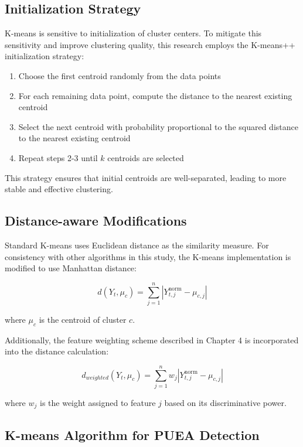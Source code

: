\subsection{Initialization Strategy}

K-means is sensitive to initialization of cluster centers. To mitigate this sensitivity and improve clustering quality, this research employs the K-means++ initialization strategy:

\begin{enumerate}
    \item Choose the first centroid randomly from the data points
    \item For each remaining data point, compute the distance to the nearest existing centroid
    \item Select the next centroid with probability proportional to the squared distance to the nearest existing centroid
    \item Repeat steps 2-3 until $k$ centroids are selected
\end{enumerate}

This strategy ensures that initial centroids are well-separated, leading to more stable and effective clustering.

\subsection{Distance-aware Modifications}

Standard K-means uses Euclidean distance as the similarity measure. For consistency with other algorithms in this study, the K-means implementation is modified to use Manhattan distance:

\begin{equation}
    d(Y_t, \mu_c) = \sum_{j=1}^{n} |Y_{t,j}^{\text{norm}} - \mu_{c,j}|
\end{equation}

where $\mu_c$ is the centroid of cluster $c$.

Additionally, the feature weighting scheme described in Chapter 4 is incorporated into the distance calculation:

\begin{equation}
    d_{weighted}(Y_t, \mu_c) = \sum_{j=1}^{n} w_j |Y_{t,j}^{\text{norm}} - \mu_{c,j}|
\end{equation}

where $w_j$ is the weight assigned to feature $j$ based on its discriminative power.

\subsection{K-means Algorithm for PUEA Detection}

